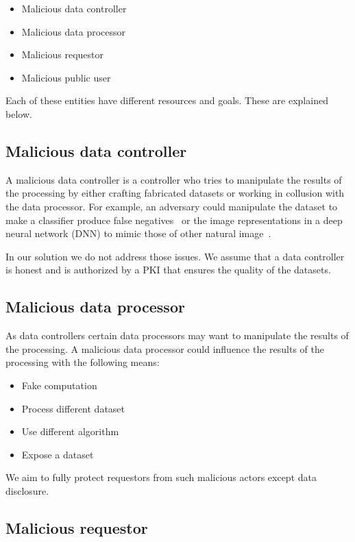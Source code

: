\begin{itemize}
  \item Malicious data controller
  \item Malicious data processor
  \item Malicious requestor
  \item Malicious public user
\end{itemize}

Each of these entities have different resources and goals. These are explained below.

\subsection{Malicious data controller}
\label{solution:treat_model:mcontroller}

A malicious data controller is a controller who tries to manipulate the results of the processing by either crafting fabricated datasets or working in collusion with the data processor. For example, an adversary could manipulate the dataset to make a classifier produce false negatives~\cite{dalvi2004adversarial} or the image representations in a deep neural network (DNN) to mimic those of other natural image~\cite{sabour2015adversarial}.

In our solution we do not address those issues. We assume that a data controller is honest and is authorized by a PKI that ensures the quality of the datasets.

\subsection{Malicious data processor}
\label{solution:treat_model:mprocessor}

As data controllers certain data processors may want to manipulate the results of the processing. A malicious data processor could influence the results of the processing with the following means:

\begin{itemize}
  \item Fake computation
  \item Process different dataset
  \item Use different algorithm
  \item Expose a dataset
\end{itemize}

We aim to fully protect requestors from such malicious actors except data disclosure.

\subsection{Malicious requestor}
\label{solution:treat_model:mrequestor}

